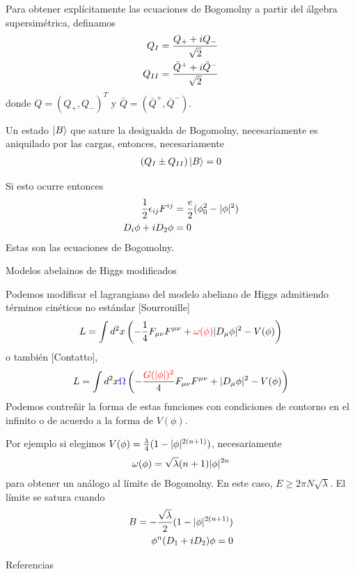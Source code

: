 \documentclass[11pt,t]{beamer}
\begin{document}
\begin{frame}
Para obtener explícitamente las ecuaciones de Bogomolny a partir del álgebra supersimétrica, definamos
\begin{align}
Q_I &= \frac{Q_++iQ_-}{\sqrt 2}\\
Q_{II} &= \frac{\bar Q^++i\bar Q^-}{\sqrt 2}
\end{align}
donde $Q = (Q_+,Q_-)^T$ y $\bar Q=(\bar Q^+,\bar Q^-)$.

Un estado $\ket{B}$ que sature la desigualda de Bogomolny, necesariamente es aniquilado por las cargas, entonces, necesariamente
\begin{align}
(Q_I\pm Q_{II})\ket{B} =0
\end{align}
\end{frame}

\begin{frame}
Si esto ocurre entonces
\begin{align}
\frac{1}{2}\epsilon_{ij}F^{ij} &= \frac{e}{2}(\phi_0^2-|\phi|^2)\\
D_i\phi+iD_2\phi &=0
\end{align}
Estas son las ecuaciones de Bogomolny.
\end{frame}

\begin{frame}{Modelos abelainos de Higgs modificados}

Podemos modificar el lagrangiano del modelo abeliano de Higgs admitiendo términos cinéticos no estándar [Sourrouille]
\begin{align}
L = \int d^2x\left(-\frac{1}{4}F_{\mu\nu}F^{\mu\nu}+\textcolor{red}{\omega(\phi)}|D_\mu\phi|^2-V(\phi)\right)
\end{align}
o también [Contatto],
\begin{align}
L = \int d^2x\textcolor{blue}{\Omega}\left(-\frac{\textcolor{red}{G(|\phi|)^2}}{4}F_{\mu\nu}F^{\mu\nu}+|D_\mu\phi|^2-V(\phi)\right)
\end{align}
Podemos contreñir la forma de estas funciones con condiciones de contorno en el infinito o de acuerdo a la forma de $V(\phi)$.

\end{frame}

\begin{frame}
Por ejemplo si elegimos $V(\phi)=\frac{\lambda}{4}(1-|\phi|^{2(n+1)})$, necesariamente
\begin{align}
\omega(\phi) = \sqrt{\lambda}(n+1)|\phi|^{2n}
\end{align}
para obtener un análogo al límite de Bogomolny. En este caso, $E\geq 2\pi N\sqrt\lambda$. El límite se satura cuando
\begin{align}
B = -\frac{\sqrt\lambda}{2}(1-|\phi|^{2(n+1)})\\
\phi^n(D_1+iD_2)\phi = 0
\end{align}
\end{frame}

\begin{frame}{Referencias}

\end{frame}
\end{document}
